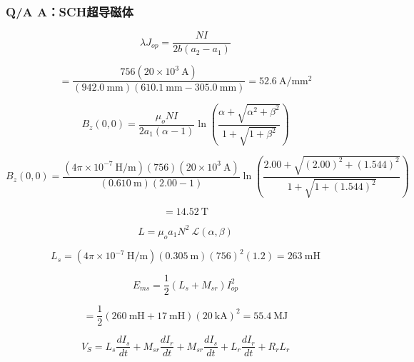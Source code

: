 \subsubsection{Q/A A：SCH超导磁体}

\begin{equation}%
\lambda J_{op}=\frac{NI}{2b(a_2-a_1)}
\end{equation}

\begin{equation}%
=\frac{756(20\times10^3\ \mathrm{A})}{(942.0\ \mathrm{mm})(610.1\ \mathrm{mm}-305.0\ \mathrm{mm})}=52.6\ \mathrm{A/mm^2}
\end{equation}

\begin{equation}%
B_{z}(0,0)=\frac{\mu_oNI}{2a_1(\alpha-1)}\ln(\frac{\alpha+\sqrt{\alpha^2+\beta^2}}{1+\sqrt{1+\beta^2}})
\end{equation}

\begin{equation}%
B_z(0,0)=\frac{(4\pi\times10^{-7}\ \mathrm{H/m})(756)(20\times10^3\ \mathrm{A})}{(0.610\ \mathrm{m})(2.00-1)}\ln(\frac{2.00+\sqrt{(2.00)^2+(1.544)^2}}{1+\sqrt{1+(1.544)^2}})
\end{equation}

\begin{equation}%
=14.52\ \mathrm{T}
\end{equation}

\begin{equation}%
L=\mu_oa_1N^2\ \mathcal{L}(\alpha,\beta)
\end{equation}

\begin{equation}%
L_s=(4\pi\times10^{-7}\ \mathrm{H/m})(0.305\ \mathrm{m})(756)^2(1.2)=263\ \mathrm{mH}
\end{equation}

\begin{equation}%
E_{ms}=\frac{1}{2}(L_s+M_{sr})I_{op}^2
\end{equation}

\begin{equation}%
=\frac{1}{2}(260\ \mathrm{mH}+17\ \mathrm{mH})(20\ \mathrm{kA})^2=55.4\ \mathrm{MJ}
\end{equation}

\begin{equation}%
V_S=L_s\frac{dI_s}{dt}+M_{sr}\frac{dI_r}{dt}+M_{sr}\frac{dI_s}{dt}+L_r\frac{dI_r}{dt}+R_rL_r
\end{equation}

